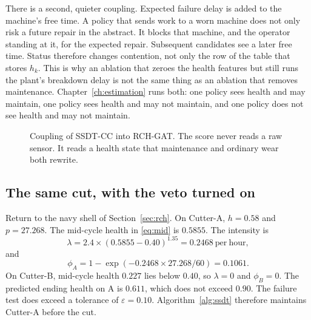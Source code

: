 There is a second, quieter coupling. Expected failure delay is added to the machine's free time. A policy that sends work to a worn machine does not only risk a future repair in the abstract. It blocks that machine, and the operator standing at it, for the expected repair. Subsequent candidates see a later free time. Status therefore changes contention, not only the row of the table that stores \(h_k\). This is why an ablation that zeroes the health features but still runs the plant's breakdown delay is not the same thing as an ablation that removes maintenance. Chapter~\ref{ch:estimation} runs both: one policy sees health and may maintain, one policy sees health and may not maintain, and one policy does not see health and may not maintain.

\begin{figure}[ht]
\centering
{}
\caption{Coupling of SSDT-CC into RCH-GAT. The score never reads a raw sensor. It reads a health state that maintenance and ordinary wear both rewrite.}
\label{fig:coupling}
\end{figure}

\subsection{The same cut, with the veto turned on}

Return to the navy shell of Section~\ref{sec:rch}. On Cutter-A, \(h = 0.58\) and \(p = 27.268\). The mid-cycle health in \eqref{eq:mid} is \(0.5855\). The intensity is
\begin{equation}
\lambda = 2.4 \times (0.5855 - 0.40)^{1.35} = 0.2468 \ \mathrm{per\ hour} ,
\end{equation}
and
\begin{equation}
\phi_A = 1 - \exp(-0.2468 \times 27.268/60) = 0.1061 .
\end{equation}
On Cutter-B, mid-cycle health \(0.227\) lies below \(0.40\), so \(\lambda = 0\) and \(\phi_B = 0\). The predicted ending health on A is \(0.611\), which does not exceed \(0.90\). The failure test does exceed a tolerance of \(\varepsilon = 0.10\). Algorithm~\ref{alg:ssdt} therefore maintains Cutter-A before the cut.

